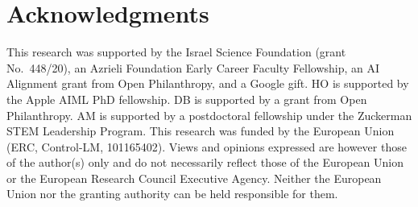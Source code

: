 \section*{Acknowledgments}
 This research was supported by the Israel Science
Foundation (grant No.\ 448/20), an Azrieli Foundation
Early Career Faculty Fellowship,  an AI Alignment grant from Open Philanthropy, and a Google gift. HO is supported by the Apple AIML PhD fellowship. DB is supported by a grant from Open Philanthropy. AM is supported by a postdoctoral fellowship under the Zuckerman STEM Leadership Program.
This research was funded by the European Union (ERC, Control-LM, 101165402). Views and opinions expressed are however those of the author(s) only and do not necessarily reflect those of the European Union or the European Research Council Executive Agency. Neither the European Union nor the granting authority can be held responsible for them.
